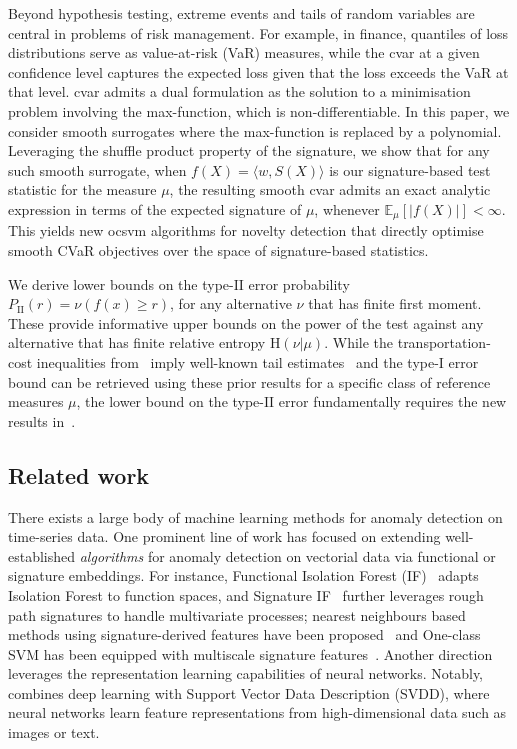 \documentclass[twoside,11pt]{article}
\numberwithin{equation}{section}
\numberwithin{theorem}{section}
\newcommand{\ex}{\mathbb{E}}
\newcommand{\Hent}{\boldsymbol{\mathrm{H}}}
\begin{document}
Beyond hypothesis testing, extreme events and tails of random variables are central in problems of risk management. For example, in finance, quantiles of loss distributions serve as value-at-risk (VaR) measures, while the \acrfull{cvar} at a given confidence level captures the expected loss given that the loss exceeds the VaR at that level. \acrshort{cvar} admits a dual formulation as the solution to a minimisation problem involving the max-function, which is non-differentiable. In this paper, we consider smooth surrogates where the max-function is replaced by a polynomial. Leveraging the shuffle product property of the signature, we show that for any such smooth surrogate, when $f(X)=\langle w, S(X)\rangle$ is our signature-based test statistic for the measure $\mu$, the resulting smooth \acrshort{cvar} admits an exact analytic expression in terms of the expected signature of $\mu$, whenever $\ex_\mu[|f(X)|]<\infty$. This yields new \acrlong{ocsvm} algorithms for novelty detection that directly optimise smooth CVaR objectives over the space of signature-based statistics. 

We derive lower bounds on the type-$\mathrm{II}$ error probability $P_{\mathrm{II}}(r)=\nu(f(x)\geq r)$, for any alternative $\nu$ that has finite first moment. These provide informative upper bounds on the power of the test against any alternative that has finite relative entropy $\Hent(\nu|\mu)$. 
While the transportation-cost inequalities from~\citet{gasteratos2023transportation} imply well-known tail estimates~\citep{cass2013integrability} and the type-$\mathrm{I}$ error bound can be retrieved using these prior results for a specific class of reference measures $\mu$, the lower bound on the type-$\mathrm{II}$ error fundamentally requires the new results in~\citep{gasteratos2023transportation}.





\subsection{Related work}

There exists a large body of machine learning methods for anomaly detection on time-series data. One prominent line of work has focused on extending well-established \emph{algorithms} for anomaly detection on vectorial data via functional or signature embeddings. For instance, Functional Isolation Forest (IF)~\citep{staerman2019functional} adapts Isolation Forest to function spaces, and Signature IF~\citep{staerman2024signature} further leverages rough path signatures to handle multivariate processes; nearest neighbours based methods using signature-derived features have been proposed~\citep{shao2020dimensionless} and One-class SVM has been equipped with multiscale signature features~\citep{mignot2024anomaly}. Another direction  leverages the representation learning capabilities of neural networks. Notably,~\citet{ruff2018deep, ruff2019self} combines deep learning with Support Vector Data Description (SVDD), where neural networks learn feature representations from high-dimensional data such as images or text. 
\end{document}
